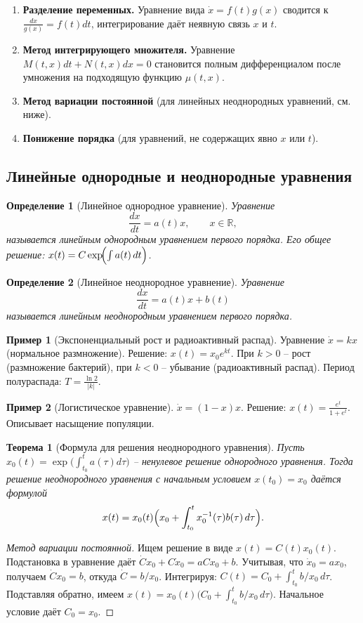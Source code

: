 \documentclass[a4paper,12pt]{article}
\newtheorem{definition}{Определение}
\newtheorem{theorem}{Теорема}
\theoremstyle{definition}
\newtheorem{example}{Пример}
\begin{document}
\begin{enumerate}
	\item \textbf{Разделение переменных.} Уравнение вида $\dot{x}=f(t)g(x)$ сводится к $\frac{dx}{g(x)}=f(t)dt$, интегрирование даёт неявную связь $x$ и $t$.
	\item \textbf{Метод интегрирующего множителя.} Уравнение $M(t,x)dt+N(t,x)dx=0$ становится полным дифференциалом после умножения на подходящую функцию $\mu(t,x)$.
	\item \textbf{Метод вариации постоянной} (для линейных неоднородных уравнений, см. ниже).
	\item \textbf{Понижение порядка} (для уравнений, не содержащих явно $x$ или $t$).
\end{enumerate}

\subsection{Линейные однородные и неоднородные уравнения}

\begin{definition}[Линейное однородное уравнение]
	Уравнение
	\[
	\frac{dx}{dt}=a(t)x,\qquad x\in\mathbb{R},
	\]
	называется \emph{линейным однородным уравнением первого порядка}.
	Его общее решение: $x(t)=C\exp\!\Bigl(\int a(t)\,dt\Bigr)$.
\end{definition}

\begin{definition}[Линейное неоднородное уравнение]
	Уравнение
	\[
	\frac{dx}{dt}=a(t)x+b(t)
	\]
	называется \emph{линейным неоднородным уравнением первого порядка}.
\end{definition}

\begin{example}[Экспоненциальный рост и радиоактивный распад]
	Уравнение $\dot{x}=kx$ (нормальное размножение). Решение: $x(t)=x_0e^{kt}$.
	При $k>0$ – рост (размножение бактерий), при $k<0$ – убывание (радиоактивный распад). Период полураспада: $T=\frac{\ln 2}{|k|}$.
\end{example}

\begin{example}[Логистическое уравнение]
	$\dot{x}=(1-x)x$. Решение: $x(t)=\frac{e^t}{1+e^t}$. Описывает насыщение популяции.
\end{example}

\begin{theorem}[Формула для решения неоднородного уравнения]
	Пусть $x_0(t)=\exp\!\bigl(\int_{t_0}^t a(\tau)d\tau\bigr)$ – ненулевое решение однородного уравнения.
	Тогда решение неоднородного уравнения с начальным условием $x(t_0)=x_0$ даётся формулой
	\[
	x(t)=x_0(t)\Bigl(x_0+\int_{t_0}^t x_0^{-1}(\tau)b(\tau)\,d\tau\Bigr).
	\]
\end{theorem}
\begin{proof}[Метод вариации постоянной]
	Ищем решение в виде $x(t)=C(t)x_0(t)$. Подстановка в уравнение даёт $\dot C x_0+C\dot x_0 = a C x_0 + b$. Учитывая, что $\dot x_0 = a x_0$, получаем $\dot C x_0 = b$, откуда $\dot C = b/x_0$. Интегрируя: $C(t)=C_0+\int_{t_0}^t b/x_0\,d\tau$. Подставляя обратно, имеем $x(t)=x_0(t)\bigl(C_0+\int_{t_0}^t b/x_0\,d\tau\bigr)$. Начальное условие даёт $C_0=x_0$.
\end{proof}
\end{document}
